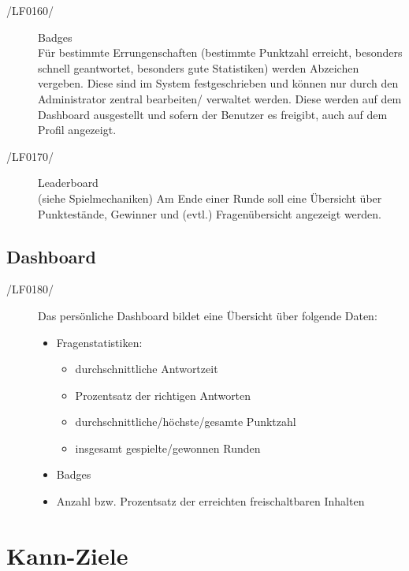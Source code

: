 \documentclass[11pt,a4paper]{scrreprt}
\begin{document}
\begin{description}
\item[/LF0160/] Badges \\
Für bestimmte Errungenschaften (bestimmte Punktzahl erreicht, besonders schnell geantwortet, besonders gute Statistiken) werden Abzeichen vergeben. Diese sind im System festgeschrieben und können nur durch den Administrator zentral bearbeiten/ verwaltet werden. Diese werden auf dem Dashboard ausgestellt und sofern der Benutzer es freigibt, auch auf dem Profil angezeigt.
\item[/LF0170/] Leaderboard \\
(siehe Spielmechaniken) Am Ende einer Runde soll eine Übersicht über Punktestände, Gewinner und (evtl.) Fragenübersicht angezeigt werden.
\end{description}
\subsection{Dashboard}
\begin{description}
\item[/LF0180/] Das persönliche Dashboard bildet eine Übersicht über folgende Daten: \\
	\begin{itemize}
	\item Fragenstatistiken:
		\begin{itemize}
		\item durchschnittliche Antwortzeit
		\item Prozentsatz der richtigen Antworten
		\item durchschnittliche/höchste/gesamte Punktzahl
		\item insgesamt gespielte/gewonnen Runden
		\end{itemize}
	\item Badges
	\item Anzahl bzw. Prozentsatz der erreichten freischaltbaren Inhalten
	\end{itemize}
\end{description}
\section{Kann-Ziele}
\end{document}
